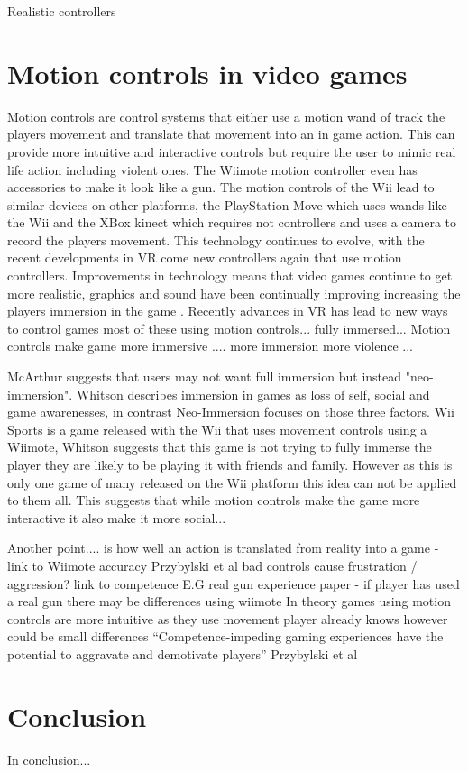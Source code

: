 \documentclass{scrartcl}
\begin{document}
Realistic controllers \cite{McGloin}

\section{Motion controls in video games}
Motion controls are control systems that either use a motion wand of track the players movement and translate that movement into an in game action. This can provide more intuitive and interactive controls but require the user to mimic real life action including violent ones. \cite{Kim} The Wiimote motion controller even has accessories to make it look like a gun.
\bigskip
The motion controls of the Wii lead to similar devices on other platforms, the PlayStation Move which uses wands 
like the Wii and the XBox kinect which requires not controllers and uses a camera to record the players movement.
This technology continues to evolve, with the recent developments in VR come new controllers again that use motion controllers. 
\bigskip
Improvements in technology means that video games continue to get more realistic, graphics and sound have been continually improving increasing the players immersion in the game \cite{Kim}. Recently advances in VR has lead to new ways to control games most of these using motion controls... fully immersed...
 \bigskip
Motion controls make game more immersive .... more immersion more violence ...
\bigskip

McArthur suggests that users may not want full immersion but instead "neo-immersion". \cite{McArthur} Whitson describes immersion in games as loss of  self, social and game awarenesses, in contrast Neo-Immersion focuses on those three factors. \cite{Whitson} Wii Sports is a game released with the Wii that uses movement controls using a Wiimote, Whitson suggests that this game is not trying to fully immerse the player they are likely to be playing it with friends and family. However as this is only one game of many released on the Wii platform this idea can not be applied to them all. 
This suggests that while motion controls make the game more interactive it also make it more social...
\bigskip


Another point.... is how well an action is translated from reality into a game  - link to Wiimote accuracy
Przybylski et al \cite{przybylski} bad controls cause frustration / aggression? link to competence
E.G real gun experience paper - if player has used a real gun there may be differences using wiimote
\bigskip
In theory games using motion controls are more intuitive as they use movement player already knows however could be small differences 
\bigskip
“Competence-impeding gaming experiences have the potential to aggravate and demotivate players”  Przybylski et al \cite{przybylski}


\section{Conclusion}
In conclusion...

	


	
\end{document}
